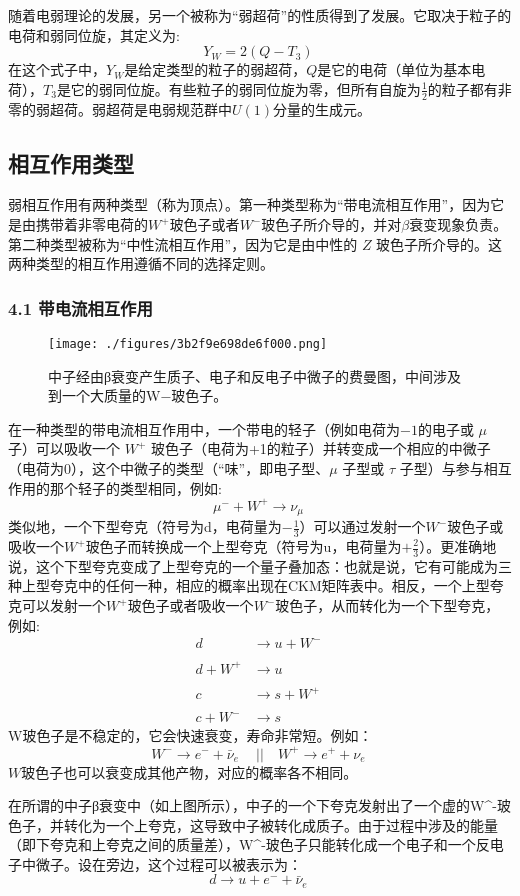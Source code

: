 随着电弱理论的发展，另一个被称为“弱超荷”的性质得到了发展。它取决于粒子的电荷和弱同位旋，其定义为:
$$Y_{W}=2(Q-T_{3})~$$
在这个式子中，$Y_{W}$是给定类型的粒子的弱超荷，$Q$是它的电荷（单位为基本电荷），$T_{3}$是它的弱同位旋。有些粒子的弱同位旋为零，但所有自旋为$\frac{1}{2}$的粒子都有非零的弱超荷。弱超荷是电弱规范群中$U(1)$分量的生成元。

\subsection{ 相互作用类型}
弱相互作用有两种类型（称为顶点）。第一种类型称为“带电流相互作用”，因为它是由携带着非零电荷的$W^{+}$玻色子或者$W^{-}$玻色子所介导的，并对$\beta$衰变现象负责。第二种类型被称为“中性流相互作用”，因为它是由中性的 $Z$ 玻色子所介导的。这两种类型的相互作用遵循不同的选择定则。

\subsubsection{4.1 带电流相互作用}
\begin{figure}[ht]
\centering
\texttt{[image: ./figures/3b2f9e698de6f000.png]}
\caption{中子经由β衰变产生质子、电子和反电子中微子的费曼图，中间涉及到一个大质量的W−玻色子。} \label{fig_RXHZY_6}
\end{figure}

在一种类型的带电流相互作用中，一个带电的轻子（例如电荷为$-1$的电子或 $\mu$ 子）可以吸收一个 $W^+$ 玻色子（电荷为+1的粒子）并转变成一个相应的中微子（电荷为$0$），这个中微子的类型（“味”，即电子型、$\mu$ 子型或 $\tau$ 子型）与参与相互作用的那个轻子的类型相同，例如:
$$\mu^- + W^+ \rightarrow \nu_\mu~$$
类似地，一个下型夸克（符号为d，电荷量为$-\frac{1}{3}$）可以通过发射一个$W^-$玻色子或吸收一个$W^+$玻色子而转换成一个上型夸克（符号为u，电荷量为$+\frac{2}{3}$）。更准确地说，这个下型夸克变成了上型夸克的一个量子叠加态：也就是说，它有可能成为三种上型夸克中的任何一种，相应的概率出现在CKM矩阵表中。相反，一个上型夸克可以发射一个$W^+$玻色子或者吸收一个$W^-$玻色子，从而转化为一个下型夸克，例如:
\begin{equation}
\begin{aligned}
d &\rightarrow u + W^{-} \\\\
d + W^{+} &\rightarrow u \\\\
c &\rightarrow s + W^{+} \\\\
c + W^{-} &\rightarrow s
\end{aligned}~
\end{equation}
W玻色子是不稳定的，它会快速衰变，寿命非常短。例如：
$$W^{-} \rightarrow e^{-} + \bar{\nu}_e \quad ~|| \quad W^{+} \rightarrow e^{+} + \nu_e~$$
$W$玻色子也可以衰变成其他产物，对应的概率各不相同。

在所谓的中子β衰变中（如上图所示），中子的一个下夸克发射出了一个虚的W^-玻色子，并转化为一个上夸克，这导致中子被转化成质子。由于过程中涉及的能量（即下夸克和上夸克之间的质量差），W^-玻色子只能转化成一个电子和一个反电子中微子。设在旁边，这个过程可以被表示为：
$$d \rightarrow u + e^{-} + \bar{\nu}_e~$$
